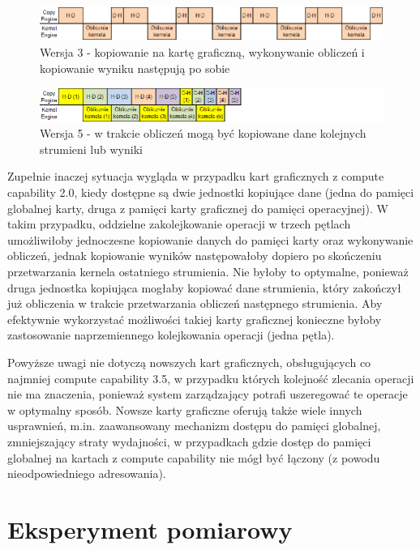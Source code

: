 \documentclass[12pt,a4paper]{article}
\begin{document}
\begin{figure}[H]
  \centering
  \includegraphics[width=\linewidth]{images/sync.png}
  \caption{Wersja 3 - kopiowanie na kartę graficzną, wykonywanie obliczeń i kopiowanie wyniku następują po sobie}
  \label{fig:seq}
\end{figure}

\begin{figure}[H]
  \centering
  \includegraphics[width=\linewidth]{images/async.png}
  \caption{Wersja 5 - w trakcie obliczeń mogą być kopiowane dane kolejnych strumieni lub wyniki}
  \label{fig:async}
\end{figure}

Zupełnie inaczej sytuacja wygląda w przypadku kart graficznych z compute capability 2.0, kiedy dostępne są dwie jednostki kopiujące dane (jedna do pamięci globalnej karty, druga z pamięci karty graficznej do pamięci operacyjnej). W takim przypadku, oddzielne zakolejkowanie operacji w trzech pętlach umożliwiłoby jednoczesne kopiowanie danych do pamięci karty oraz wykonywanie obliczeń, jednak kopiowanie wyników następowałoby dopiero po skończeniu przetwarzania kernela ostatniego strumienia. Nie byłoby to optymalne, ponieważ druga jednostka kopiująca mogłaby kopiować dane strumienia, który zakończył już obliczenia w trakcie przetwarzania obliczeń następnego strumienia. Aby efektywnie wykorzystać możliwości takiej karty graficznej konieczne byłoby zastosowanie naprzemiennego kolejkowania operacji (jedna pętla).

Powyższe uwagi nie dotyczą nowszych kart graficznych, obsługujących co najmniej compute capability 3.5, w przypadku których kolejność zlecania operacji nie ma znaczenia, ponieważ system zarządzający potrafi uszeregować te operacje w optymalny sposób. Nowsze karty graficzne oferują także wiele innych usprawnień, m.in. zaawansowany mechanizm dostępu do pamięci globalnej, zmniejszający straty wydajności, w przypadkach gdzie dostęp do pamięci globalnej na kartach z compute capability nie mógł być łączony (z powodu nieodpowiedniego adresowania).


\section{Eksperyment pomiarowy}
\end{document}
